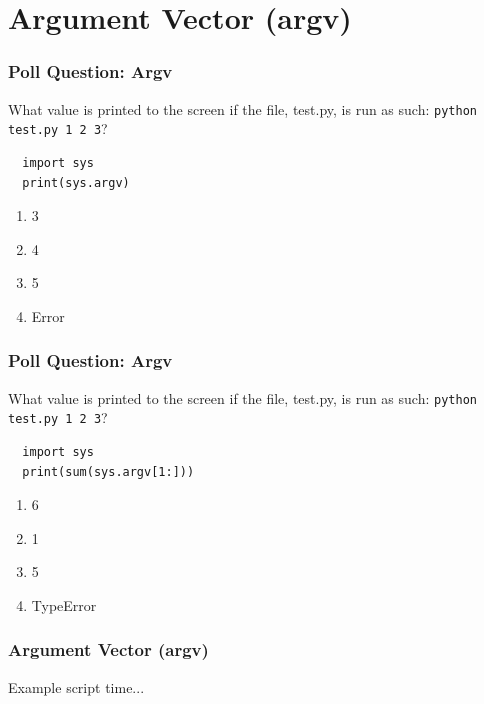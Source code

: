 \documentclass{beamer}
\begin{document}
\section{Argument Vector (argv)}

%
%
\begin{frame}[fragile]
  \frametitle{Poll Question: Argv}
  What value is printed to the screen if the file, test.py, is run as such: \lstinline|python test.py 1 2 3|?
  \begin{lstlisting}
  import sys
  print(sys.argv)
  \end{lstlisting} 
  \vfill
  \begin{enumerate}[A]
    \item 3
    \item 4
    \item 5
    \item Error
  \end{enumerate}
\end{frame}

%
%
\begin{frame}[fragile]
  \frametitle{Poll Question: Argv}
  What value is printed to the screen if the file, test.py, is run as such: \lstinline|python test.py 1 2 3|?
  \begin{lstlisting}
  import sys
  print(sum(sys.argv[1:]))
  \end{lstlisting} 
  \vfill
  \begin{enumerate}[A]
    \item 6
    \item 1
    \item 5
    \item TypeError
  \end{enumerate}
\end{frame}


%
%
\begin{frame}[fragile]
  \frametitle{Argument Vector (argv)}
  Example script time...
\end{frame}
\end{document}
